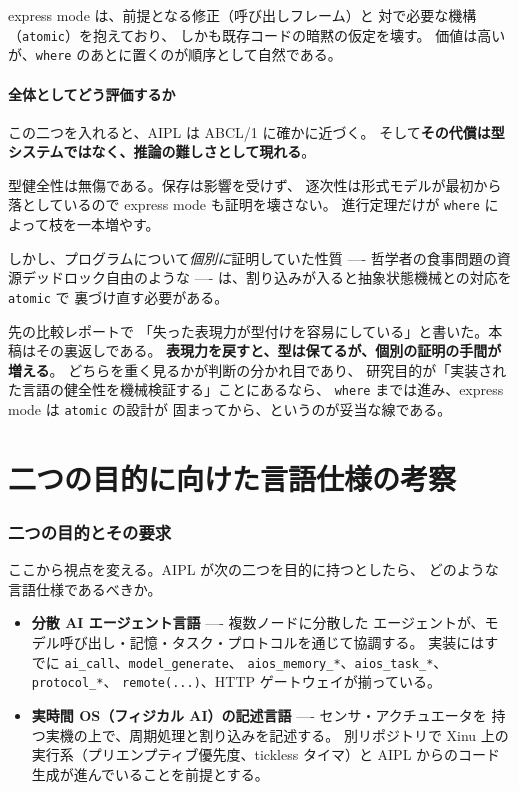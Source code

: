 \documentclass[11pt,a4paper]{ltjsarticle}
\theoremstyle{remark}
\begin{document}
express mode は、前提となる修正（呼び出しフレーム）と
対で必要な機構（\texttt{atomic}）を抱えており、
しかも既存コードの暗黙の仮定を壊す。
価値は高いが、\texttt{where} のあとに置くのが順序として自然である。

\subsection{全体としてどう評価するか}

この二つを入れると、AIPL は ABCL/1 に確かに近づく。
そして\textbf{その代償は型システムではなく、推論の難しさとして現れる}。

型健全性は無傷である。保存は影響を受けず、
逐次性は形式モデルが最初から落としているので express mode も証明を壊さない。
進行定理だけが \texttt{where} によって枝を一本増やす。

しかし、プログラムについて\emph{個別に}証明していた性質
---- 哲学者の食事問題の資源デッドロック自由のような ----
は、割り込みが入ると抽象状態機械との対応を \texttt{atomic} で
裏づけ直す必要がある。

先の比較レポートで
「失った表現力が型付けを容易にしている」と書いた。本稿はその裏返しである。
\textbf{表現力を戻すと、型は保てるが、個別の証明の手間が増える}。
どちらを重く見るかが判断の分かれ目であり、
研究目的が「実装された言語の健全性を機械検証する」ことにあるなら、
\texttt{where} までは進み、express mode は \texttt{atomic} の設計が
固まってから、というのが妥当な線である。

\part{二つの目的に向けた言語仕様の考察}
\label{part:purpose}

\section{二つの目的とその要求}

ここから視点を変える。AIPL が次の二つを目的に持つとしたら、
どのような言語仕様であるべきか。

\begin{itemize}
\item \textbf{分散 AI エージェント言語} ---- 複数ノードに分散した
  エージェントが、モデル呼び出し・記憶・タスク・プロトコルを通じて協調する。
  実装にはすでに \texttt{ai\_call}、\texttt{model\_generate}、
  \texttt{aios\_memory\_*}、\texttt{aios\_task\_*}、\texttt{protocol\_*}、
  \texttt{remote(...)}、HTTP ゲートウェイが揃っている。
\item \textbf{実時間 OS（フィジカル AI）の記述言語} ---- センサ・アクチュエータを
  持つ実機の上で、周期処理と割り込みを記述する。
  別リポジトリで Xinu 上の実行系（プリエンプティブ優先度、tickless タイマ）と
  AIPL からのコード生成が進んでいることを前提とする。
\end{itemize}
\end{document}
